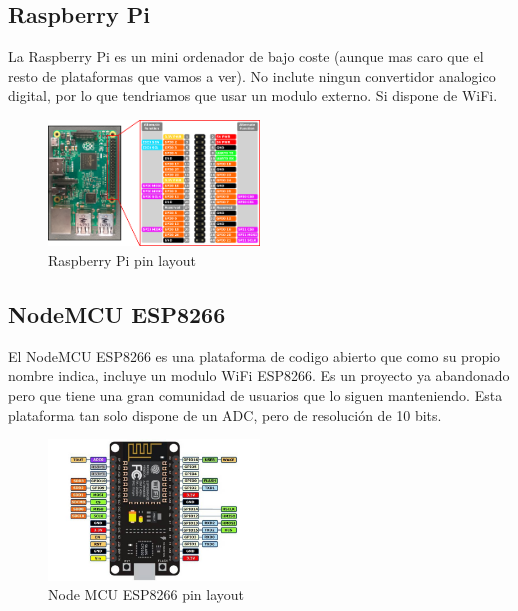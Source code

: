 \begin{titlepage}
\subsection{Raspberry Pi}
La Raspberry Pi\cite{ref9} es un mini ordenador de bajo coste (aunque mas caro que el resto de plataformas que vamos a ver). No inclute ningun convertidor analogico digital, por lo que tendriamos que usar un modulo externo. Si dispone de WiFi.
\begin{figure}[h!]
	\centering
	\includegraphics[width=0.5\textwidth]{imagenes/rpi.png}
	\caption{Raspberry Pi pin layout\cite{rpi_img}}
\end{figure}
\subsection{ NodeMCU ESP8266}
El NodeMCU ESP8266\cite{ref10} es una plataforma de codigo abierto que como su propio nombre indica, incluye un modulo WiFi ESP8266. Es un proyecto ya abandonado pero que tiene una gran comunidad de usuarios que lo siguen manteniendo. Esta plataforma tan solo dispone de un ADC, pero de resolución de 10 bits. \\
\begin{figure}[h!]
	\centering
	\includegraphics[width=0.5\textwidth]{imagenes/esp8266.jpg}
	\caption{Node MCU ESP8266 pin layout\cite{esp8266_img}}
\end{figure}

\end{titlepage}
